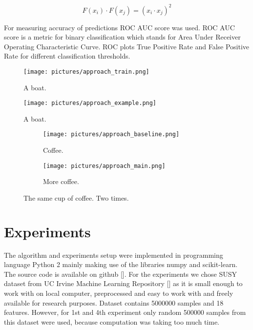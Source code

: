 \documentclass{scrartcl}
\begin{document}
\begin{equation}
F(x_i) \cdot F(x_j) = (x_i \cdot x_j)^2
\end{equation}


For measuring accuracy of predictions ROC AUC score was used. ROC AUC score is a metric for binary classification which stands for Area Under Receiver Operating Characteristic Curve. ROC plots True Positive Rate and False Positive Rate for different classification thresholds. 

\begin{figure}[h!]
  \begin{center}
    \texttt{[image: pictures/approach\_train.png]}
  \end{center}
  \caption{A boat.}
  \label{fig:boat1}
\end{figure}

\begin{figure}[h!]
  \texttt{[image: pictures/approach\_example.png]}
  \caption{A boat.}
  \label{fig:boat2}
\end{figure}

\begin{figure}[h!]
  \centering
  \begin{subfigure}[b]{0.45\linewidth}
    \texttt{[image: pictures/approach\_baseline.png]}
    \caption{Coffee.}
  \end{subfigure}\hfill%
  \begin{subfigure}[b]{0.45\linewidth}
    \texttt{[image: pictures/approach\_main.png]}
    \caption{More coffee.}
  \end{subfigure}
  \caption{The same cup of coffee. Two times.}
  \label{fig:approach}
\end{figure}



\section{Experiments}
The algorithm and experiments setup were implemented in programming language Python 2 mainly making use of  the libraries numpy and scikit-learn. The source code is available on github []. For the experiments we chose SUSY dataset from UC Irvine Machine Learning Repository [] as it is small enough to work with on local computer, preprocessed and easy to work with and freely available for research purposes. Dataset contains 5000000 samples and 18 features. However, for 1st and 4th experiment only random 500000 samples from this dataset were used, because computation was taking too much time. 
\end{document}
